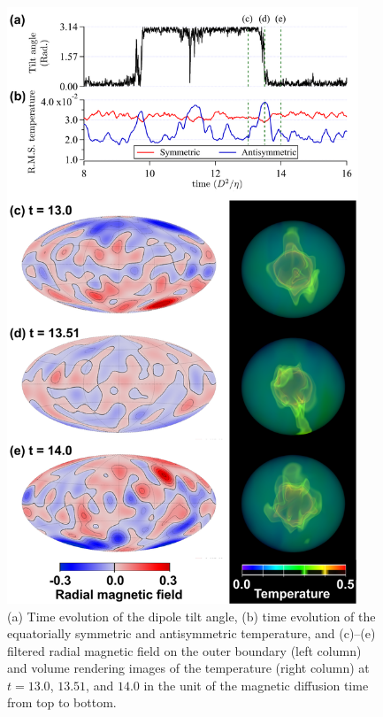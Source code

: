 \begin{figure}[ht]
\begin{center}
\includegraphics*[width=105mm]
{Figures/Figure2_again2.png}
\end{center}
\caption{
(a) Time evolution of the dipole tilt angle, (b) time evolution of the equatorially symmetric and antisymmetric temperature, and (c)--(e) filtered radial magnetic field on the outer boundary (left column) and volume rendering images of the temperature (right column) at $t = 13.0$, $13.51$, and $14.0$ in the unit of the magnetic diffusion time from top to bottom.
}
\label{fig:temperature_rendering}
\end{figure}